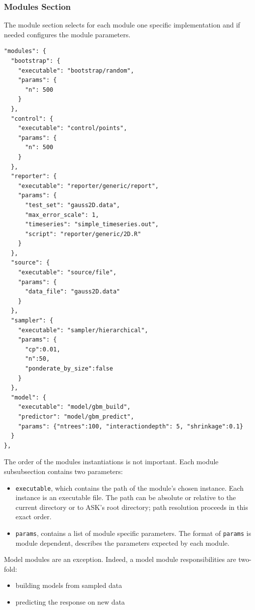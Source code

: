 \subsubsection{Modules Section}

The module section selects for each module one specific implementation and if needed configures the module parameters.

\begin{verbatim}
"modules": {
  "bootstrap": {
    "executable": "bootstrap/random",
    "params": {
      "n": 500
    }
  },
  "control": {
    "executable": "control/points",
    "params": {
      "n": 500
    }
  },
  "reporter": {
    "executable": "reporter/generic/report",
    "params": {
      "test_set": "gauss2D.data",
      "max_error_scale": 1,
      "timeseries": "simple_timeseries.out",
      "script": "reporter/generic/2D.R"
    }
  },
  "source": {
    "executable": "source/file",
    "params": {
      "data_file": "gauss2D.data"
    }
  },
  "sampler": {
    "executable": "sampler/hierarchical",
    "params": {
      "cp":0.01,
      "n":50,
      "ponderate_by_size":false
    }
  },
  "model": {
    "executable": "model/gbm_build",
    "predictor": "model/gbm_predict",
    "params": {"ntrees":100, "interactiondepth": 5, "shrinkage":0.1}
  }
},
\end{verbatim}

The order of the modules instantiations is not important.
Each module subsubsection contains two parameters:
\begin{itemize}
	\item \texttt{executable}, which contains the path of the module's chosen instance. Each instance is an executable file. The path can be absolute or relative to the current directory or to ASK's root directory; path resolution proceeds in this exact order.
	\item \texttt{params}, contains a list of module specific parameters. The format of \texttt{params} is module dependent,  describes the parameters expected by each module.
\end{itemize}

Model modules are an exception. Indeed, a model module responsibilities are two-fold:
\begin{itemize}
	\item building models from sampled data
	\item predicting the response on new data
\end{itemize}

